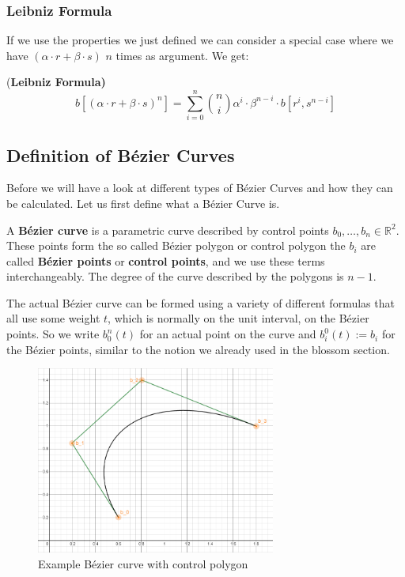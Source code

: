\subsubsection{Leibniz Formula}
If we use the properties we just defined we can consider a special case where we have $(\alpha \cdot r + \beta \cdot s)$ $n$ times as argument. We get:
\begin{lem}\label{leib}(\textbf{Leibniz Formula)}
\[b[(\alpha \cdot r + \beta \cdot s)^n] = \sum_{i=0}^n \binom{n}{i} \alpha^{i} \cdot \beta^{n-i} \cdot b[r^{i}, s^{n-i}]\]
\end{lem}
\subsection{Definition of Bézier Curves}
Before we will have a look at different types of Bézier Curves and how they can be calculated. Let us first define what a Bézier Curve is.
\begin{definition}
A \textbf{Bézier curve} is a parametric curve described by control points $b_0, \dots, b_n \in \mathbb{R}^2$. These points form the so called Bézier polygon or control polygon the $b_i$ are called \textbf{Bézier points} or \textbf{control points}, and we use these terms interchangeably. The degree of the curve described by the polygons is $n-1$. \\
\end{definition}
The actual Bézier curve can be formed using a variety of different formulas that all use some weight $t$, which is normally on the unit interval, on the Bézier points. So we write $b_0^n(t)$ for an actual point on the curve and $b_i^0(t) := b_i$ for the Bézier points, similar to the notion we already used in the blossom section.

\begin{figure}[H]
    \centering
    \includegraphics[width=0.7\textwidth]{Beispiel_Bezierkurve.png}
    \caption{Example Bézier curve with control polygon}
    \label{fig:my_label}
\end{figure}

